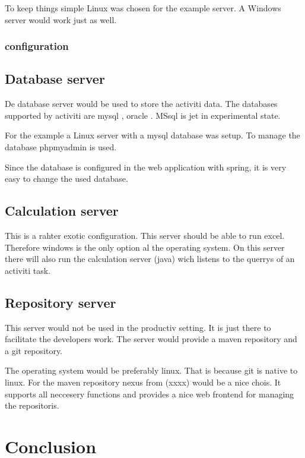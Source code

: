 \documentclass[paper=a4,twoside=false,BCOR=0mm,DIV=calc,fontsize=12pt]{scrartcl}
\begin{document}
To keep things simple Linux was chosen for the example server. A Windows server would work just as well.

\subsubsection{configuration}


\subsection{Database server}
De database server would be used to store the activiti data. The databases supported by activiti are mysql \cite{mysql}, oracle \cite{oracledb}. MSsql \cite{mssql} is jet in experimental state.
 
For the example a Linux server with a mysql database was setup.
To manage the database phpmyadmin \cite{phpmyadmin} is used.

Since the database is configured in the web application with spring, it is very easy to change the used database.


\subsection{Calculation server}
This is a rahter exotic configuration. This server should be able to run excel. Therefore windows is the only option al the operating system. On this server there will also run the calculation server (java) wich listens to the querrys of an activiti task.



\subsection{Repository server}
This server would not be used in the productiv setting. It is just there to facilitate the developers work.
The server would provide a maven repository and a git repository. 

The operating system would be preferably linux. That is because git is native to linux.
For the maven repository nexus from (xxxx) would be a nice chois. It supports all neccesery functions and provides a nice web frontend for managing the repositoris.






\section{Conclusion}
\end{document}
